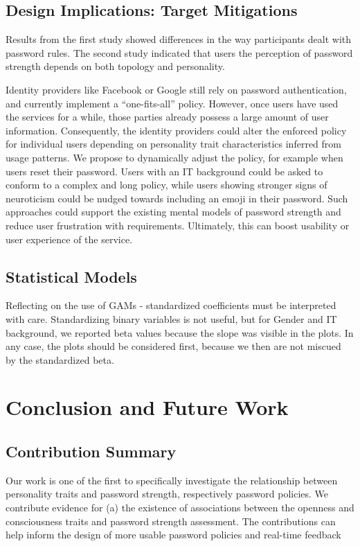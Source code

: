 \subsection{Design Implications: Target Mitigations}
Results from the first study showed differences in the way participants dealt with password rules. The second study indicated that users the perception of password strength depends on both topology and personality. 

Identity providers like Facebook or Google still rely on password authentication, and currently implement a ``one-fits-all'' policy. However, once users have used the services for a while, those parties already possess a large amount of user information. Consequently, the identity providers could alter the enforced policy for individual users depending on personality trait characteristics inferred from usage patterns. We propose to dynamically adjust the policy, for example when users reset their password. Users with an IT background could be asked to conform to a complex
 and long policy, while users showing stronger signs of neuroticism could be nudged towards including an emoji in their password. Such approaches could support the existing mental models of password strength and reduce user frustration with requirements. Ultimately, this can boost usability or user experience of the service. 
 
 
\subsection{Statistical Models}
Reflecting on the use of GAMs - standardized coefficients must be interpreted with care. Standardizing binary variables is not useful, but for Gender and IT background, we reported beta values because the slope was visible in the plots. In any case, the plots should be considered first, because we then are not miscued by the standardized beta. 

\section{Conclusion and Future Work}



\subsection{Contribution Summary}
Our work is one of the first to specifically investigate the relationship between personality traits and password strength, respectively password policies. We contribute evidence for (a) the existence of associations between the openness and consciousness traits and password strength assessment. 
The contributions can help  inform the design of more usable password policies and real-time feedback

